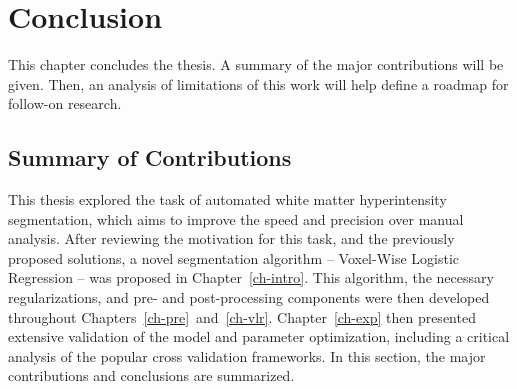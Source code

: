 \chapter{Conclusion}\label{ch-conc}
This chapter concludes the thesis.
A summary of the major contributions will be given.
Then, an analysis of limitations of this work will help define
a roadmap for follow-on research.
\section{Summary of Contributions}
This thesis explored the task of automated white matter hyperintensity segmentation,
which aims to improve the speed and precision over manual analysis.
After reviewing the motivation for this task,
and the previously proposed solutions,
a novel segmentation algorithm -- Voxel-Wise Logistic Regression --
was proposed in Chapter~\ref{ch-intro}.
This algorithm, the necessary regularizations, and pre- and post-processing components
were then developed throughout Chapters~\ref{ch-pre}~and~\ref{ch-vlr}.
Chapter~\ref{ch-exp} then presented extensive validation of
the model and parameter optimization,
including a critical analysis of the popular cross validation frameworks.
In this section, the major contributions and conclusions are summarized.

